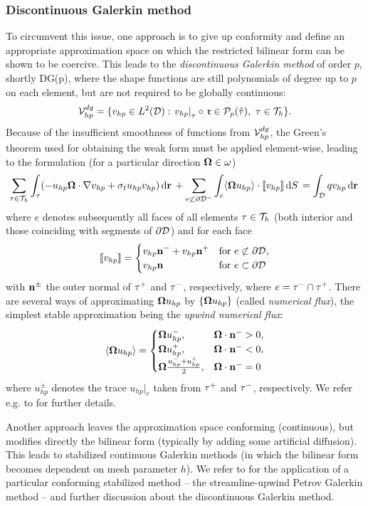 \subsubsection{Discontinuous Galerkin method}\label{sec:DGM}
To circumvent this issue, one approach is to give up conformity and define an appropriate approximation space on which
the restricted bilinear form can be shown to be coercive. This leads to the \textit{discontinuous Galerkin method}
of order $p$, shortly DG(p), where the shape functions are still polynomials of degree up to $p$ on each element, but
are not required to be globally continuous:
$$
\Space_{hp}^{dg} = \{v_{hp} \in \Lp[2](\VV): \left. v_{hp}\right\vert_{\elem} \circ\, \mathfrak{r} \in
	\mathcal{P}_p(\hat{\elem}),\ \elem\in\mesh
	\}.
$$
Because of the insufficient smoothness of functions from $\Space_{hp}^{dg}$, the Green's theorem used for obtaining the
weak form must be applied element-wise, leading to the formulation (for a particular direction $\bomega\in\omega$)
$$
	\sum_{\elem\in\mesh}\int_{\elem} (-u_{hp}\bomega\cdot\nabla v_{hp} + 
	\sigma_t u_{hp} v_{hp})\,\d{\br} + \sum_{e\not\subset\pV[-]}\int_{e} \langle\bomega u_{hp}\rangle\cdot \jump{v_{hp}}\,
	\d{S} = \int_{\VV} q v_{hp}\,\d{\br} 
$$
where $e$ denotes subsequently all faces of all elements $\elem\in\mesh$ (both interior and those coinciding with
segments of $\pV$) and for each face
$$
	\jump{v_{hp}} = \pw{v_{hp}\bn^- + v_{hp}\bn^+}{for $e\not\subset\pV$}{v_{hp}\bn}{for $e\subset\pV$}
$$
with $\bn^{\pm}$ the outer normal of $\elem^+$ and $\elem^-$, respectively, where $e = \elem^- \cap \elem^+$.
There are several ways of approximating $\bomega u_{hp}$ by $\{\bomega u_{hp}\}$ (called \textit{numerical flux}), the
simplest stable approximation being the \textit{upwind numerical flux}:
$$
	\langle\bomega u_{hp}\rangle = 
	\begin{cases}
		\bomega u_{hp}^-, & \bomega\cdot\bn^- > 0,\\
		\bomega u_{hp}^+, & \bomega\cdot\bn^- < 0,\\
		\bomega \frac{u_{hp}^- + u_{hp}^+}{2}, & \bomega\cdot\bn^- = 0
	\end{cases}
$$
where $u_{hp}^{\pm}$ denotes the trace $u_{hp}\vert_e$ taken from $\elem^+$ and $\elem^-$, respectively. We refer e.g.
to \cite{hartmann} for further details.

Another approach leaves the approximation space conforming (continuous), but modifies directly the bilinear form
(typically by adding some artificial diffusion). This leads to stabilized continuous Galerkin methods (in which
the bilinear form becomes dependent on mesh parameter $h$). We refer to \cite{kanschat} for the application of a
particular conforming stabilized method -- the streamline-upwind Petrov Galerkin method -- and further discussion about
the discontinuous Galerkin method.

